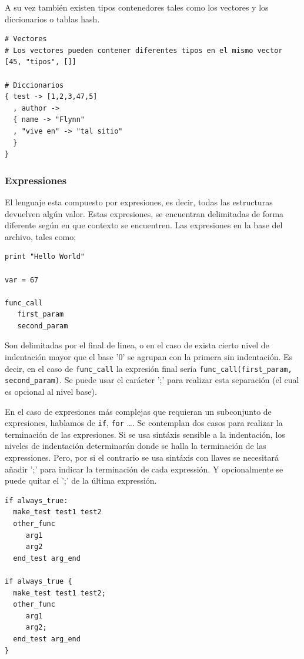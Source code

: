\documentclass[11pt]{article}
\begin{document}
A su vez también existen tipos contenedores tales como los vectores y los
diccionarios o tablas hash.

\begin{verbatim}
# Vectores
# Los vectores pueden contener diferentes tipos en el mismo vector
[45, "tipos", []]

# Diccionarios
{ test -> [1,2,3,47,5]
  , author ->
  { name -> "Flynn"
  , "vive en" -> "tal sitio"
  }
}

\end{verbatim}

\subsubsection{Expressiones}
\label{sec:org3824c4a}
El lenguaje esta compuesto por expresiones, es decir, todas las estructuras devuelven algún valor. Estas expresiones, se encuentran delimitadas de forma diferente según en que contexto
se encuentren.
Las expresiones en la base del archivo, tales como;
\begin{verbatim}
print "Hello World"

var = 67

func_call
   first_param
   second_param
\end{verbatim}

Son delimitadas por el final de linea, o en el caso de exista cierto nivel de indentación mayor que el base '0' se agrupan con la primera sin indentación. Es decir, en el caso de \texttt{func\_call}
la expresión final sería \texttt{func\_call(first\_param, second\_param)}. Se puede usar el carácter ';' para realizar esta separación (el cual es opcional al nivel base).

En el caso de expresiones más complejas que requieran un subconjunto de expresiones, hablamos de \texttt{if}, \texttt{for} \ldots{}. Se contemplan dos casos para realizar la terminación de las expresiones.
Si se usa sintáxis sensible a la indentación, los niveles de indentación determinarán donde se halla la terminación de las expressiones. Pero, por si el contrario se usa sintáxis con llaves
se necesitará añadir ';' para indicar la terminación de cada expressión. Y opcionalmente se puede quitar el ';' de la última expressión.

\begin{verbatim}
if always_true:
  make_test test1 test2
  other_func
     arg1
     arg2
  end_test arg_end

if always_true {
  make_test test1 test2;
  other_func
     arg1
     arg2;
  end_test arg_end
}
\end{verbatim}
\end{document}
